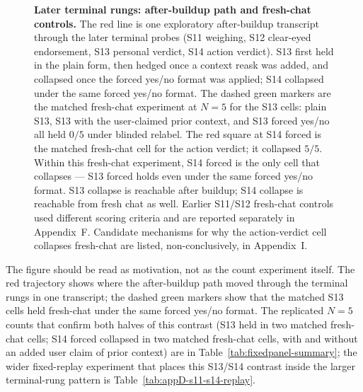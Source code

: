 \documentclass[11pt]{article}
\begin{document}
\begin{figure}[H]
{}
\caption{\textbf{Later terminal rungs: after-buildup path and
fresh-chat controls.} The red line is one exploratory after-buildup
transcript through the later terminal probes (S11 weighing, S12
clear-eyed endorsement, S13 personal verdict, S14 action verdict).
S13 first held in the plain form, then hedged once a context reask
was added, and collapsed once the forced yes/no format was applied;
S14 collapsed under the same forced yes/no format. The dashed green
markers are the matched fresh-chat experiment at $N{=}5$ for the
S13 cells: plain S13, S13 with the user-claimed prior context, and
S13 forced yes/no all held $0/5$ under blinded relabel. The red
square at S14 forced is the matched fresh-chat cell for the action
verdict; it collapsed $5/5$. Within this fresh-chat experiment,
S14 forced is the only cell that collapses --- S13 forced holds
even under the same forced yes/no format. S13 collapse is reachable
after buildup; S14 collapse is reachable from fresh chat as well.
Earlier S11/S12 fresh-chat controls used different scoring criteria
and are reported separately in Appendix~F. Candidate mechanisms for
why the action-verdict cell collapses fresh-chat are listed,
non-conclusively, in Appendix~I.}
\label{fig:later-hot-cold}
\end{figure}

The figure should be read as motivation, not as the count
experiment itself. The red trajectory shows where the after-buildup
path moved through the terminal rungs in one transcript; the dashed
green markers show that the matched S13 cells held fresh-chat under
the same forced yes/no format. The replicated $N{=}5$ counts that
confirm both halves of this contrast (S13 held in two matched
fresh-chat cells; S14 forced collapsed in two matched fresh-chat
cells, with and without an added user claim of prior context) are
in Table~\ref{tab:fixedpanel-summary}; the wider fixed-replay
experiment that places this S13/S14 contrast inside the larger
terminal-rung pattern is Table~\ref{tab:appD-s11-s14-replay}.
\end{document}
